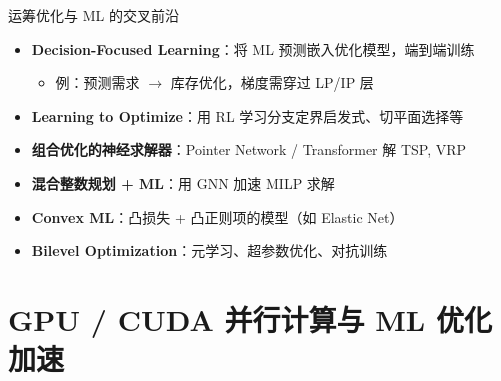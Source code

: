 \documentclass[11pt, aspectratio=169, svgnames, table, fontset=fandol]{ctexbeamer}
\begin{document}
\begin{frame}{运筹优化与 ML 的交叉前沿}
  \begin{itemize}
    \item \textbf{Decision-Focused Learning}：将 ML 预测嵌入优化模型，端到端训练
      \begin{itemize}
        \item 例：预测需求 $\to$ 库存优化，梯度需穿过 LP/IP 层
      \end{itemize}
    \item \textbf{Learning to Optimize}：用 RL 学习分支定界启发式、切平面选择等
    \item \textbf{组合优化的神经求解器}：Pointer Network / Transformer 解 TSP, VRP
    \item \textbf{混合整数规划 + ML}：用 GNN 加速 MILP 求解
    \item \textbf{Convex ML}：凸损失 + 凸正则项的模型（如 Elastic Net）
    \item \textbf{Bilevel Optimization}：元学习、超参数优化、对抗训练
  \end{itemize}
\end{frame}

\section{GPU / CUDA 并行计算与 ML 优化加速}
\end{document}
